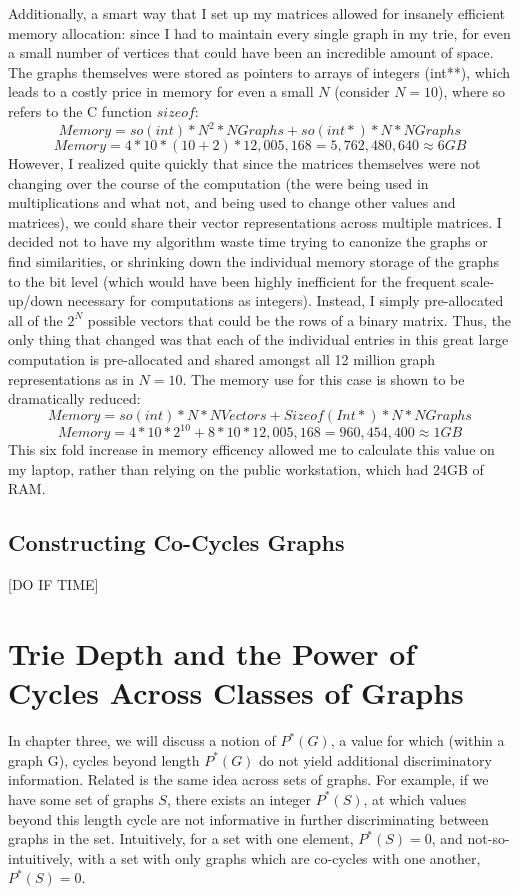 Additionally, a smart way that I set up my matrices allowed for insanely efficient memory allocation: since I had to maintain every single graph in my trie, for even a small number of vertices that could have been an incredible amount of space.
The graphs themselves were stored as pointers to arrays of integers (int**), which leads to a costly price in memory for even a small $N$ (consider $N=10$), where so refers to the C function $sizeof$:
$$Memory = so(int) * N^2 * NGraphs + so(int*) * N * NGraphs $$
$$Memory = 4 * 10 * (10+2) * 12,005,168 = 5,762,480,640 \approx 6 GB $$
However, I realized quite quickly that since the matrices themselves were not changing over the course of the computation (the were being used in multiplications and what not, and being used to change other values and matrices), we could share their vector representations across multiple matrices.
I decided not to have my algorithm waste time trying to canonize the graphs or find similarities, or shrinking down the individual memory storage of the graphs to the bit level (which would have been highly inefficient for the frequent scale-up/down necessary for computations as integers).
Instead, I simply pre-allocated all of the $2^N$ possible vectors that could be the rows of a binary matrix.
Thus, the only thing that changed was that each of the individual entries in this great large computation is pre-allocated and shared amongst all 12 million graph representations as in $N = 10$.  The memory use for this case is shown to be dramatically reduced:
$$Memory = so(int) * N * NVectors + Sizeof(Int*) * N * NGraphs$$
$$Memory = 4 * 10 * 2^{10} + 8 * 10 * 12,005,168 = 960,454,400 \approx 1 GB $$
This six fold increase in memory efficency allowed me to calculate this value on my laptop, rather than relying on the public workstation, which had 24GB of RAM.


\subsection{Constructing Co-Cycles Graphs}

[DO IF TIME]

\section{Trie Depth and the Power of Cycles Across Classes of Graphs}

In chapter three, we will discuss a notion of $P^*(G)$, a value for which (within a graph G), cycles beyond length $P^*(G)$ do not yield additional discriminatory information.
Related is the same idea across sets of graphs.
For example, if we have some set of graphs $S$, there exists an integer $P^*(S)$, at which values beyond this length cycle are not informative in further discriminating between graphs in the set.
Intuitively, for a set with one element, $P^*(S) = 0$, and not-so-intuitively, with a set with only graphs which are co-cycles with one another, $P^*(S) = 0$.

